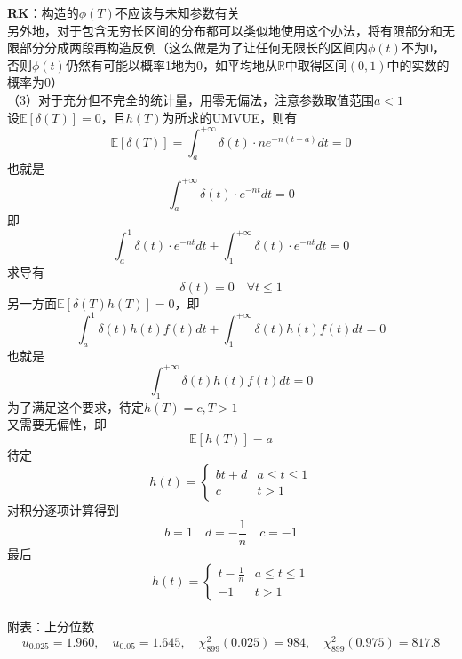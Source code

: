 \documentclass[UTF8]{ctexart}
\begin{document}
\textbf{RK}：构造的$\phi(T)$不应该与未知参数有关\\
另外地，对于包含无穷长区间的分布都可以类似地使用这个办法，将有限部分和无限部分分成两段再构造反例（这么做是为了让任何无限长的区间内$\phi(t)$不为0，否则$\phi(t)$仍然有可能以概率1地为0，如平均地从$\mathbb{R}$中取得区间$(0,1)$中的实数的概率为0）\\
（3）对于充分但不完全的统计量，用零无偏法，注意参数取值范围$a<1$\\
设$\mathbb{E}[\delta(T)]=0$，且$h(T)$为所求的UMVUE，则有
\[
\mathbb{E}[\delta(T)]=\int_a^{+\infty} \delta(t) \cdot n e^{-n(t-a)} d t=0 
\]
也就是
\[
\int_a^{+\infty} \delta(t) \cdot  e^{-nt} d t=0 
\]
即
\[
\int_a^{1} \delta(t) \cdot  e^{-nt} d t+\int_1^{+\infty} \delta(t) \cdot  e^{-nt} d t=0 
\]
求导有
\[
\delta(t)=0\quad \forall t \le 1
\]
另一方面$\mathbb{E}\left[\delta(T)h(T) \right]=0 $，即
\[
\int_a^{1} \delta(t)h(t)f(t)d t+\int_1^{+\infty} \delta(t)h(t)f(t) d t=0
\]
也就是
\[
\int_1^{+\infty} \delta(t)h(t)f(t) d t=0
\]
为了满足这个要求，待定$h(T)=c,T>1$\\
又需要无偏性，即
\[
\mathbb{E}[h(T)]=a
\]
待定
\[
h(t)=
\begin{cases}
	bt+d  &  a\le t \le 1\\
	c  &  t>1
\end{cases}
\]
对积分逐项计算得到
\[
b=1\quad d=-\frac{1}{n}\quad c=-1
\]
最后
\[
h(t)=
\begin{cases}
	t-\frac{1}{n}  &  a\le t \le 1\\
	-1  &  t>1
\end{cases}
\]\\







\noindent 附表：上分位数
$$
u_{0.025}=1.960, \quad u_{0.05}=1.645, \quad \chi_{899}^2(0.025)=984, \quad \chi_{899}^2(0.975)=817.8
$$
\end{document}
